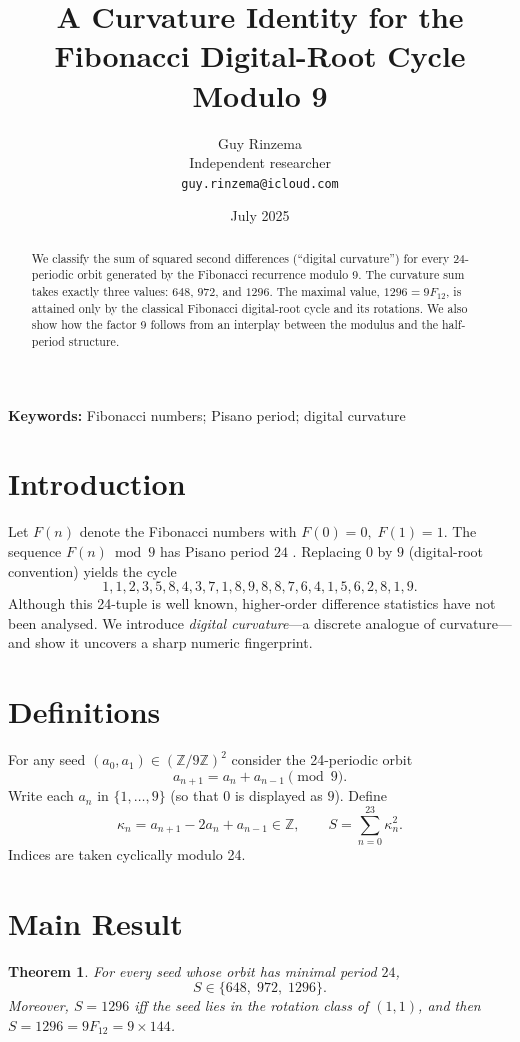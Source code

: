 \documentclass[12pt]{article}
\title{A Curvature Identity for the Fibonacci Digital-Root Cycle Modulo 9}
\author{Guy Rinzema\\
Independent researcher\\
\texttt{guy.rinzema@icloud.com}}
\date{July 2025}
\newtheorem{thm}{Theorem}
\begin{document}
\maketitle

\begin{abstract}
We classify the sum of squared second differences (``digital curvature'') for every
24-periodic orbit generated by the Fibonacci recurrence modulo 9.
The curvature sum takes exactly three values: $648$, $972$, and $1296$.
The maximal value, $1296 = 9F_{12}$, is attained only by the classical Fibonacci
digital-root cycle and its rotations.  We also show how the factor 9 follows from
an interplay between the modulus and the half-period structure.
\end{abstract}

\noindent\textbf{Keywords:} Fibonacci numbers; Pisano period; digital curvature

\section{Introduction}

Let $F(n)$ denote the Fibonacci numbers with $F(0)=0,\;F(1)=1$.
The sequence $F(n)\bmod 9$ has Pisano period $24$ \cite{Wall1960}.
Replacing $0$ by $9$ (digital-root convention) yields the cycle
\[
1,1,2,3,5,8,4,3,7,1,8,9,8,8,7,6,4,1,5,6,2,8,1,9.
\]
Although this 24-tuple is well known, higher-order difference statistics have not
been analysed.  We introduce \emph{digital curvature}—a discrete analogue of
curvature—and show it uncovers a sharp numeric fingerprint.

\section{Definitions}

For any seed $(a_0,a_1)\in(\mathbb Z/9\mathbb Z)^2$ consider the 24-periodic
orbit
\[
a_{n+1}=a_n+a_{n-1}\pmod 9.
\]
Write each $a_n$ in $\{1,\dots,9\}$ (so that $0$ is displayed as $9$).
Define
\[
\kappa_n=a_{n+1}-2a_n+a_{n-1}\in\mathbb Z,
\qquad
S=\sum_{n=0}^{23}\kappa_n^{2}.
\]
Indices are taken cyclically modulo 24.

\section{Main Result}

\begin{thm}
For every seed whose orbit has minimal period $24$,
\[
S\in\{648,\;972,\;1296\}.
\]
Moreover, $S=1296$ iff the seed lies in the rotation class of $(1,1)$, and then
$S=1296=9F_{12}=9\times144$.
\end{thm}
\end{document}
